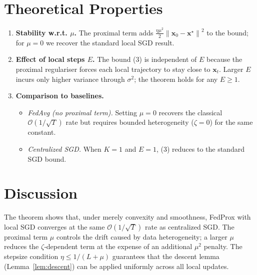 \documentclass{article}
\newcommand{\norm}[1]{\left\|#1\right\|}
\begin{document}
\section*{Theoretical Properties}
\begin{enumerate}[label=\textbf{P\arabic*}]
\item \textbf{Stability w.r.t. $\mu$.} The proximal term adds $\frac{\eta\mu^2}{2}\norm{\mathbf{x}_0-\mathbf{x}^\star}^2$ to the bound; for $\mu=0$ we recover the standard local SGD result.
\item \textbf{Effect of local steps $E$.} The bound (3) is independent of $E$ because the proximal regulariser forces each local trajectory to stay close to $\mathbf{x}_t$. Larger $E$ incurs only higher variance through $\sigma^2$; the theorem holds for any $E\ge1$.
\item \textbf{Comparison to baselines.}
   \begin{itemize}
   \item \emph{FedAvg (no proximal term).} Setting $\mu=0$ recovers the classical $\mathcal{O}(1/\sqrt{T})$ rate but requires bounded heterogeneity ($\zeta=0$) for the same constant.
   \item \emph{Centralized SGD.} When $K=1$ and $E=1$, (3) reduces to the standard SGD bound.
   \end{itemize}
\end{enumerate}

\section*{Discussion}
The theorem shows that, under merely convexity and smoothness, FedProx with local SGD converges at the same $\mathcal{O}(1/\sqrt{T})$ rate as centralized SGD. The proximal term $\mu$ controls the drift caused by data heterogeneity; a larger $\mu$ reduces the $\zeta$‑dependent term at the expense of an additional $\mu^2$ penalty. The stepsize condition $\eta\le1/(L+\mu)$ guarantees that the descent lemma (Lemma~\ref{lem:descent}) can be applied uniformly across all local updates.

\newpage
\end{document}
